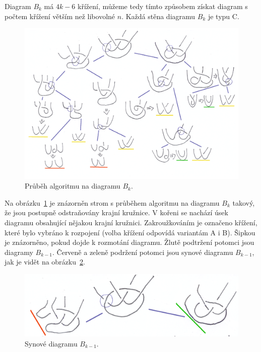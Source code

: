 \begin{dukaz}
Diagram $B_k$ má $4k-6$ křížení, můžeme tedy tímto způsobem získat diagram s počtem křížení větším než libovolné $n$. Každá stěna diagramu $B_k$ je typu C.

\begin{figure}[p] \centering
\includegraphics[scale=0.45]{../img/horniodhad}
\caption{Průběh algoritmu na diagramu $B_k$.} \label{prubehhorni}
\end{figure}

Na obrázku~\ref{prubehhorni} je znázorněn strom s průběhem algoritmu na diagramu $B_k$ takový, že jsou postupně odstraňovány krajní kružnice. V kořeni se nachází úsek diagramu obsahující nějakou krajní kružnici. Zakroužkováním je označeno křížení, které bylo vybráno k rozpojení (volba křížení odpovídá variantám A i B). Šipkou je znázorněno, pokud dojde k rozmotání diagramu. Žlutě podtržení potomci jsou diagramy $B_{k-1}$. Červeně a zeleně podržení potomci jsou synové diagramu $B_{k-1}$, jak je vidět na obrázku~\ref{rozdvojeni}.

\begin{figure}[p] \centering
\includegraphics[scale=0.3]{../img/rozdvojeni}
\caption{Synové diagramu $B_{k-1}$.}  \label{rozdvojeni}
\end{figure}


\end{dukaz}
